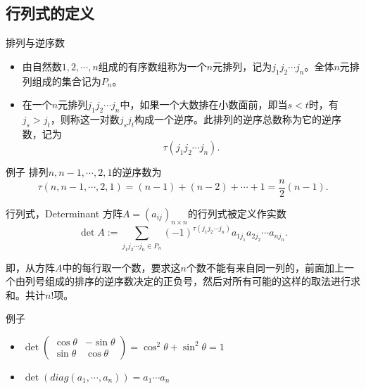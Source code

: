 \subsection{行列式的定义}


\begin{frame}

\begin{block}{排列与逆序数}
\begin{itemize}
\item 由自然数$1,2,\cdots,n$组成的有序数组称为一个$n$元排列，记为$j_1j_2\cdots j_n$。全体$n$元排列组成的集合记为$P_n$。
\item 在一个$n$元排列$j_1j_2\cdots j_n$中，如果一个大数排在小数面前，即当$s<t$时，有$j_s>j_t$，则称这一对数$j_sj_t$构成一个逆序。此排列的逆序总数称为它的逆序数，记为$$\tau(j_1j_2\cdots j_n).$$
\end{itemize}

\end{block}

\begin{block}{例子}
排列$n, n-1, \cdots, 2, 1$的逆序数为
$$\tau(n, n-1, \cdots, 2, 1) = (n-1)+(n-2)+\cdots+1 = \frac{n}{2}(n-1).$$
\end{block}

\end{frame}


\begin{frame}

\begin{block}{行列式，Determinant}
方阵$A = (a_{ij})_{n\times n}$的行列式被定义作实数
$$\det A := \sum\limits_{j_1j_2\cdots j_n \in P_n} (-1)^{\tau(j_1j_2\cdots j_n)} a_{1j_1}a_{2j_2}\cdots a_{nj_n}.$$
\end{block}

\pause

即，从方阵$A$中的每行取一个数，要求这$n$个数不能有来自同一列的，前面加上一个由列号组成的排序的逆序数决定的正负号，然后对所有可能的这样的取法进行求和。共计$n!$项。

\pause

\begin{block}{例子}
\begin{itemize}
\item \(\displaystyle \det \begin{pmatrix} \cos\theta & -\sin\theta \\ \sin\theta & \cos\theta \end{pmatrix} = \cos^2\theta + \sin^2\theta = 1\)
\item $\det(diag(a_1, \cdots, a_n)) = a_1\cdots a_n$
\end{itemize}
\end{block}

\end{frame}


